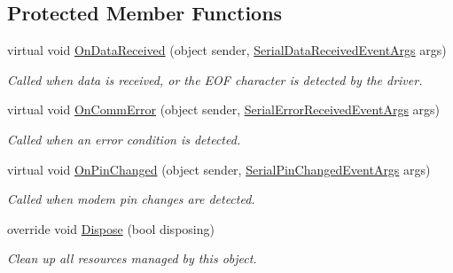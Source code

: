 \subsection*{Protected Member Functions}
\begin{DoxyCompactItemize}
\item 
virtual void \mbox{\hyperlink{class_r_j_c_p_1_1_i_o_1_1_ports_1_1_serial_port_stream_af3431a83388a99e3e9098628be9a93a2}{On\+Data\+Received}} (object sender, \mbox{\hyperlink{class_r_j_c_p_1_1_i_o_1_1_ports_1_1_serial_data_received_event_args}{Serial\+Data\+Received\+Event\+Args}} args)
\begin{DoxyCompactList}\small\item\em Called when data is received, or the E\+OF character is detected by the driver. \end{DoxyCompactList}\item 
virtual void \mbox{\hyperlink{class_r_j_c_p_1_1_i_o_1_1_ports_1_1_serial_port_stream_a56904d54d700793f5df8c9a790ee4c5b}{On\+Comm\+Error}} (object sender, \mbox{\hyperlink{class_r_j_c_p_1_1_i_o_1_1_ports_1_1_serial_error_received_event_args}{Serial\+Error\+Received\+Event\+Args}} args)
\begin{DoxyCompactList}\small\item\em Called when an error condition is detected. \end{DoxyCompactList}\item 
virtual void \mbox{\hyperlink{class_r_j_c_p_1_1_i_o_1_1_ports_1_1_serial_port_stream_af0988ba0b2d418cda6fe84ef833615fb}{On\+Pin\+Changed}} (object sender, \mbox{\hyperlink{class_r_j_c_p_1_1_i_o_1_1_ports_1_1_serial_pin_changed_event_args}{Serial\+Pin\+Changed\+Event\+Args}} args)
\begin{DoxyCompactList}\small\item\em Called when modem pin changes are detected. \end{DoxyCompactList}\item 
override void \mbox{\hyperlink{class_r_j_c_p_1_1_i_o_1_1_ports_1_1_serial_port_stream_af7d3477d73f74ebbfd372a2a99d9c146}{Dispose}} (bool disposing)
\begin{DoxyCompactList}\small\item\em Clean up all resources managed by this object. \end{DoxyCompactList}\end{DoxyCompactItemize}

